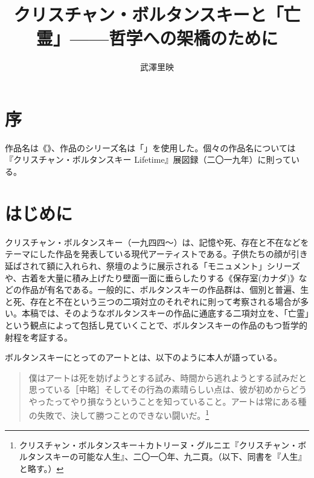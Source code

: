 \documentclass[b5j,twoside,twocolumn]{utarticle}
\title{\tbaselineshift =4.0pt クリスチャン・ボルタンスキーと「亡霊」------哲学への架橋のために}
\author{武澤里映}
\date{\vspace{-5mm}}
\makeatletter
\def\yakuchu{%
\@ifnextchar[\@xfootnote %
{\stepcounter{yakuchu}%
\protected@xdef\@thefnmark{\theyakuchu}%
\@footnotemark\@footnotetext}}
\makeatother
\begin{document}
\maketitle

\setlength{\footskip}{-2mm}
\chead[]{}
\lfoot[]{\thepage{}}
\cfoot[]{}
\rfoot[\thepage{}]{}

\let\yakuchu=\endnote
\renewcommand{\footnoterule}{\noindent\rule{100mm}{0.3mm}\vskip2mm}
\thispagestyle{fancy}
\section*{序}

作品名は《》、作品のシリーズ名は「」を使用した。個々の作品名については『クリスチャン・ボルタンスキー Lifetime』展図録（二〇一九年）に則っている。
\setcounter{section}{0}
\section{はじめに}
クリスチャン・ボルタンスキー（一九四四〜）は、記憶や死、存在と不在などをテーマにした作品を発表している現代アーティストである。子供たちの顔が引き延ばされて額に入れられ、祭壇のように展示される「モニュメント」シリーズや、古着を大量に積み上げたり壁面一面に垂らしたりする《保存室(カナダ)》などの作品が有名である。一般的に、ボルタンスキーの作品群は、個別と普遍、生と死、存在と不在という三つの二項対立のそれぞれに則って考察される場合が多い。本稿では、そのようなボルタンスキーの作品に通底する二項対立を、「亡霊」という観点によって包括し見ていくことで、ボルタンスキーの作品のもつ哲学的射程を考証する。


ボルタンスキーにとってのアートとは、以下のように本人が語っている。
\begin{quote}
僕はアートは死を妨げようとする試み、時間から逃れようとする試みだと思っている［中略］そしてその行為の素晴らしい点は、彼が初めからどうやったってやり損なうということを知っていること。アートは常にある種の失敗で、決して勝つことのできない闘いだ。\footnote{クリスチャン・ボルタンスキー＋カトリーヌ・グルニエ『クリスチャン・ボルタンスキーの可能な人生』、二〇一〇年、九二頁。（以下、同書を『人生』と略す。）}
\end{quote}
\end{document}
